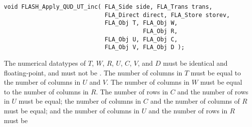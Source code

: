 \begin{flaspec}
\begin{verbatim}
void FLASH_Apply_QUD_UT_inc( FLA_Side side, FLA_Trans trans,
                             FLA_Direct direct, FLA_Store storev,
                             FLA_Obj T, FLA_Obj W,
                                        FLA_Obj R,
                             FLA_Obj U, FLA_Obj C,
                             FLA_Obj V, FLA_Obj D );
\end{verbatim}
\begin{checks}
\checkitem
The numerical datatypes of $ T $, $ W $, $ R $, $ U $, $ C $, $ V $, and $ D $
must be identical and floating-point, and must not be \flaconstantns.
\itemvsp
\checkitem
The number of columns in $ T $ must be equal to the number of columns in $ U $
and $ V $.
\itemvsp
\checkitem
The number of columns in $ W $ must be equal to the number of columns in $ R $.
\itemvsp
\checkitem
The number of rows in $ C $ and the number of rows in $ U $ must be equal; the
number of columns in $ C $ and the number of columns of $ R $ must be equal;
and the number of columns in $ U $ and the number of rows in $ R $ must be

\end{checks}
\end{flaspec}
